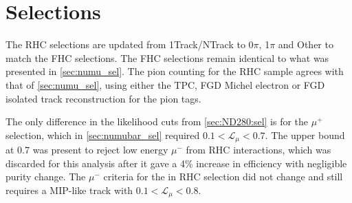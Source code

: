 \section{Selections}
The RHC selections are updated from 1Track/NTrack to 0$\pi$, 1$\pi$ and Other to match the FHC selections. The FHC selections remain identical to what was presented in \autoref{sec:numu_sel}. The pion counting for the RHC sample agrees with that of \autoref{sec:numu_sel}, using either the TPC, FGD Michel electron or FGD isolated track reconstruction for the pion tags.

The only difference in the likelihood cuts from \autoref{sec:ND280:sel} is for the $\mu^+$ selection, which in \autoref{sec:numubar_sel} required $0.1 < \mathcal{L}_\mu < 0.7$. The upper bound at 0.7 was present to reject low energy $\mu^-$ from \numu RHC interactions, which was discarded for this analysis after it gave a 4\% increase in efficiency with negligible purity change. The $\mu^-$ criteria for the \numu in RHC selection did not change and still requires a MIP-like track with $0.1 < \mathcal{L}_\mu < 0.8$.

